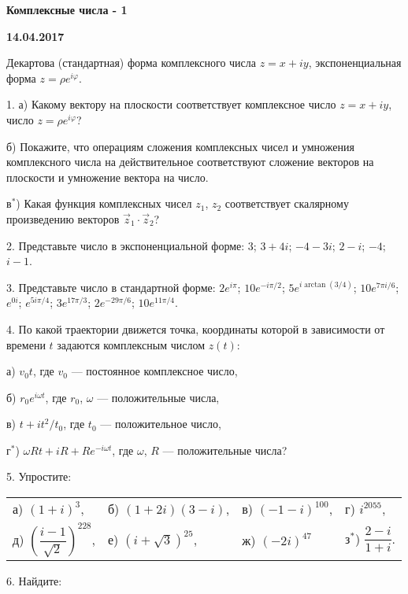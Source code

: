 \documentclass[14pt]{article}
\begin{document}
\begin{center}
\Large{\textbf{Комплексные числа - 1}}

\textbf{14.04.2017}

\vspace{5mm}
\end{center}

Декартова (стандартная) форма комплексного числа $z=x+iy$, экспоненциальная форма $z=\rho e^{i\varphi}$.

1. а) Какому вектору на плоскости соответствует комплексное число $z=x+iy$, число $z=\rho e^{i\varphi}$?

б) Покажите, что операциям сложения комплексных чисел и умножения комплексного числа на действительное соответствуют сложение векторов на плоскости и умножение вектора на число.

в$^*$) Какая функция комплексных чисел $z_1$, $z_2$ соответствует скалярному произведению векторов $\vec{z}_1\cdot \vec{z}_2$?

2. Представьте число в экспоненциальной форме: $3$; $3+4i$; $-4-3i$; $2-i$; $-4$; $i-1$.

3. Представьте число в стандартной форме: $2e^{i\pi}$; $10e^{-i \pi/2}$; $5e^{i\arctan(3/4)}$; $10e^{7\pi i/6}$; $e^{0i}$; $e^{5i\pi/4}$; $3e^{17\pi/3}$; $2e^{-29\pi/6}$; $10e^{11\pi/4}$.

4. По какой траектории движется точка, координаты которой в зависимости от времени $t$ задаются комплексным числом $z(t)$:

а) $v_0 t$, где $v_0$ --- постоянное комплексное число,

б) $r_0 e^{i\omega t}$, где $r_0$, $\omega$ --- положительные числа,

в) $t+it^2/t_0$, где $t_0$ --- положительное число,

г$^*$) $\omega Rt+iR+R e^{-i\omega t}$, где $\omega$, $R$ --- положительные числа?

5. Упростите:

\begin{tabular}{llll}
а) $(1+i)^3$, \hspace{2cm} & б) $(1+2i)(3-i)$, \hspace{2cm} & в) $(-1-i)^{100}$, \hspace{2cm} & г) $i^{2055}$,\\
д) $\left(\dfrac{i-1}{\sqrt2}\right)^{228}$, & е) $(i+\sqrt3)^{25}$, & ж) $(-2i)^{47}$ & з$^*$) $\dfrac{2-i}{1+i}$.
\end{tabular}

6. Найдите:
\end{document}
